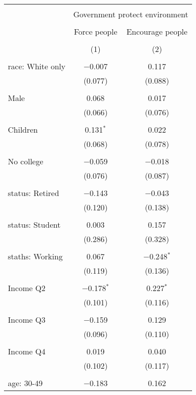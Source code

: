 
\begin{tabular}{@{\extracolsep{5pt}}lcc} 
\\[-1.8ex]\hline 
\hline \\[-1.8ex] 
 & \multicolumn{2}{c}{Government protect environment} \\ 
\cline{2-3} 
\\[-1.8ex] & Force people & Encourage people \\ 
\\[-1.8ex] & (1) & (2)\\ 
\hline \\[-1.8ex] 
 race: White only & $-$0.007 & 0.117 \\ 
  & (0.077) & (0.088) \\ 
  & & \\ 
 Male & 0.068 & 0.017 \\ 
  & (0.066) & (0.076) \\ 
  & & \\ 
 Children & 0.131$^{*}$ & 0.022 \\ 
  & (0.068) & (0.078) \\ 
  & & \\ 
 No college & $-$0.059 & $-$0.018 \\ 
  & (0.076) & (0.087) \\ 
  & & \\ 
 status: Retired & $-$0.143 & $-$0.043 \\ 
  & (0.120) & (0.138) \\ 
  & & \\ 
 status: Student & 0.003 & 0.157 \\ 
  & (0.286) & (0.328) \\ 
  & & \\ 
 staths: Working & 0.067 & $-$0.248$^{*}$ \\ 
  & (0.119) & (0.136) \\ 
  & & \\ 
 Income Q2 & $-$0.178$^{*}$ & 0.227$^{*}$ \\ 
  & (0.101) & (0.116) \\ 
  & & \\ 
 Income Q3 & $-$0.159 & 0.129 \\ 
  & (0.096) & (0.110) \\ 
  & & \\ 
 Income Q4 & 0.019 & 0.040 \\ 
  & (0.102) & (0.117) \\ 
  & & \\ 
 age: 30-49 & $-$0.183 & 0.162 \\ 

\end{tabular}
